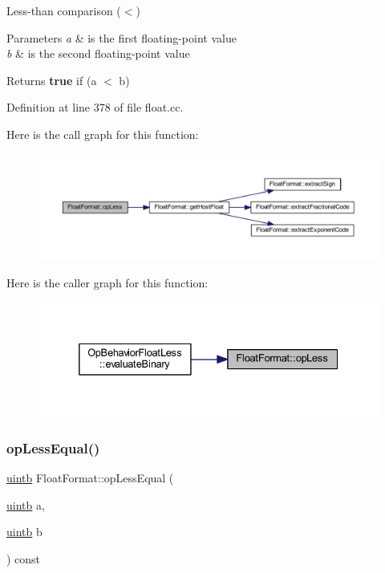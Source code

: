 Less-\/than comparison ($<$) 


\begin{DoxyParams}{Parameters}
{\em a} & is the first floating-\/point value \\
\hline
{\em b} & is the second floating-\/point value \\
\hline
\end{DoxyParams}
\begin{DoxyReturn}{Returns}
{\bfseries{true}} if (a $<$ b) 
\end{DoxyReturn}


Definition at line 378 of file float.\+cc.

Here is the call graph for this function\+:
\nopagebreak
\begin{figure}[H]
\begin{center}
\leavevmode
\includegraphics[width=350pt]{class_float_format_a257b216d9b9e5aad3b693df46624cc6d_cgraph}
\end{center}
\end{figure}
Here is the caller graph for this function\+:
\nopagebreak
\begin{figure}[H]
\begin{center}
\leavevmode
\includegraphics[width=332pt]{class_float_format_a257b216d9b9e5aad3b693df46624cc6d_icgraph}
\end{center}
\end{figure}
\mbox{\label{class_float_format_adaf425a89e09270969f6fd848bf06025}} 
\subsubsection{\texorpdfstring{opLessEqual()}{opLessEqual()}}
{\footnotesize\ttfamily \mbox{\hyperlink{types_8h_a2db313c5d32a12b01d26ac9b3bca178f}{uintb}} Float\+Format\+::op\+Less\+Equal (\begin{DoxyParamCaption}\item[{\mbox{\hyperlink{types_8h_a2db313c5d32a12b01d26ac9b3bca178f}{uintb}}}]{a,  }\item[{\mbox{\hyperlink{types_8h_a2db313c5d32a12b01d26ac9b3bca178f}{uintb}}}]{b }\end{DoxyParamCaption}) const}




